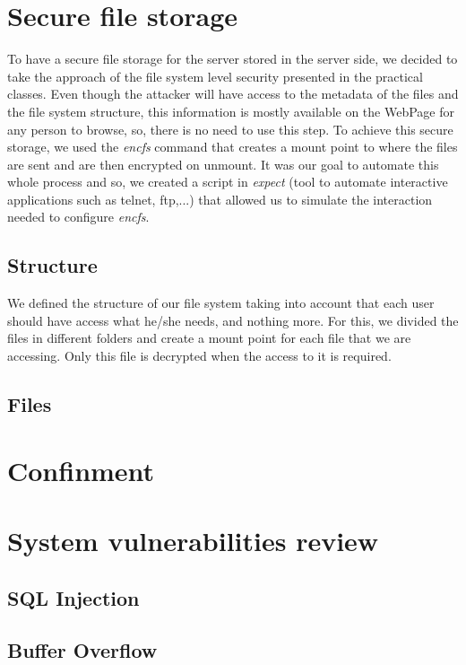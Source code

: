 \documentclass[11pt,a4paper]{report}
\begin{document}
\chapter{Secure file storage}
To have a secure file storage for the server stored in the server side, we decided to take the approach of the file system level security presented in the practical classes. Even though the attacker will have access to the metadata of the files and the file system structure, this information is mostly available on the WebPage for any person to browse, so, there is no need to use this step.
\newline
To achieve this secure storage, we used the \emph{encfs} command that creates a mount point to where the files are sent and are then encrypted on unmount.
\newline
It was our goal to automate this whole process and so, we created a script in \emph{expect} (tool to automate interactive applications such as telnet, ftp,...) that allowed us to simulate the interaction needed to configure \emph{encfs}.

\section{Structure}
We defined the structure of our file system taking into account that each user should have access what he/she needs, and nothing more.
\newline
For this, we divided the files in different folders and create a mount point for each file that we are accessing. Only this file is decrypted when the access to it is required.

\section{Files}

\chapter{Confinment}

\chapter{System vulnerabilities review}
\section{SQL Injection}
\section{Buffer Overflow}
\end{document}
